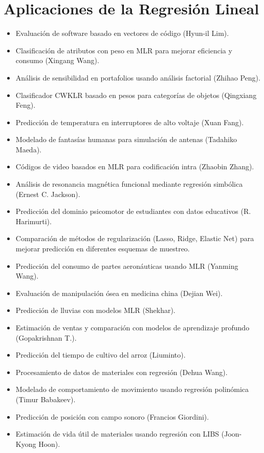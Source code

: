 \documentclass[12pt]{article}
\begin{document}
\section*{Aplicaciones de la Regresi\'on Lineal}
\begin{itemize}
  \item Evaluaci\'on de software basado en vectores de c\'odigo (Hyun-il Lim).
  \item Clasificaci\'on de atributos con peso en MLR para mejorar eficiencia y consumo (Xingang Wang).
  \item An\'alisis de sensibilidad en portafolios usando an\'alisis factorial (Zhihao Peng).
  \item Clasificador CWKLR basado en pesos para categor\'ias de objetos (Qingxiang Feng).
  \item Predicci\'on de temperatura en interruptores de alto voltaje (Xuan Fang).
  \item Modelado de fantas\'ias humanas para simulaci\'on de antenas (Tadahiko Maeda).
  \item C\'odigos de video basados en MLR para codificaci\'on intra (Zhaobin Zhang).
  \item An\'alisis de resonancia magn\'etica funcional mediante regresi\'on simb\'olica (Ernest C. Jackson).
  \item Predicci\'on del dominio psicomotor de estudiantes con datos educativos (R. Harimurti).
  \item Comparaci\'on de m\'etodos de regularizaci\'on (Lasso, Ridge, Elastic Net) para mejorar predicci\'on en diferentes esquemas de muestreo.
  \item Predicci\'on del consumo de partes aeron\'auticas usando MLR (Yanming Wang).
  \item Evaluaci\'on de manipulaci\'on \'osea en medicina china (Dejian Wei).
  \item Predicci\'on de lluvias con modelos MLR (Shekhar).
  \item Estimaci\'on de ventas y comparaci\'on con modelos de aprendizaje profundo (Gopakrishnan T.).
  \item Predicci\'on del tiempo de cultivo del arroz (Liuminto).
  \item Procesamiento de datos de materiales con regresi\'on (Dehua Wang).
  \item Modelado de comportamiento de movimiento usando regresi\'on polin\'omica (Timur Babakeev).
  \item Predicci\'on de posici\'on con campo sonoro (Francios Giordini).
  \item Estimaci\'on de vida \'util de materiales usando regresi\'on con LIBS (Joon-Kyong Hoon).

\end{itemize}
\end{document}
